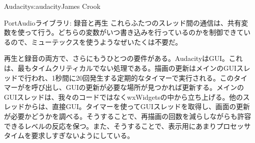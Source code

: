 \begin{aosachapter}{Audacity}{s:audacity}{James Crook}
\begin{aosasect1}{PortAudioライブラリ: 録音と再生}
これらふたつのスレッド間の通信は、共有変数を使って行う。どちらの変数がいつ書き込みを行っているのかを制御できているので、ミューテックスを使うようなぜいたくは不要だ。

\pagebreak

再生と録音の両方で、さらにもうひとつの要件がある。AudacityはGUI。これは、最もタイムクリティカルでない処理である。描画の更新はメインのGUIスレッドで行われ、1秒間に20回発生する定期的なタイマーで実行される。このタイマーがを呼び出し、GUIの更新が必要な場所が見つかれば更新する。メインのGUIスレッドは、我々のコードではなくwxWidgetsの中から立ち上げる。他のスレッドからは、直接GUI。タイマーを使ってGUIスレッドを取得し、画面の更新が必要かどうかを調べる。そうすることで、再描画の回数を減らしながらも許容できるレベルの反応を保つ。また、そうすることで、表示用にあまりプロセッサタイムを要求しすぎないようにしている。


\end{aosasect1}
\end{aosachapter}
